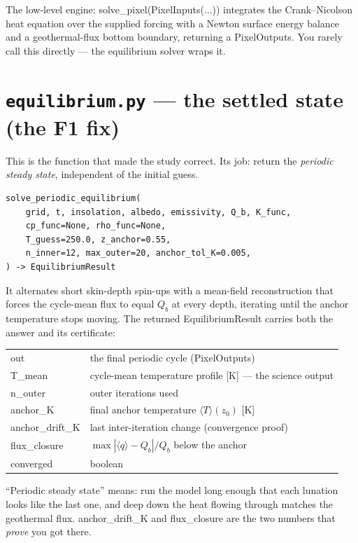 \documentclass[11pt]{report}
\newcommand{\code}[1]{{\ttfamily\small #1}}
\begin{document}
The low-level engine: \code{solve\_pixel(PixelInputs(...))} integrates the
Crank--Nicolson heat equation over the supplied forcing with a Newton
surface energy balance and a geothermal-flux bottom boundary, returning a
\code{PixelOutputs}. You rarely call this directly --- the equilibrium
solver wraps it.

\section{\texttt{equilibrium.py} --- the settled state (the F1 fix)}

This is the function that made the study correct. Its job: return the
\emph{periodic steady state}, independent of the initial guess.

\begin{lstlisting}[style=py]
solve_periodic_equilibrium(
    grid, t, insolation, albedo, emissivity, Q_b, K_func,
    cp_func=None, rho_func=None,
    T_guess=250.0, z_anchor=0.55,
    n_inner=12, max_outer=20, anchor_tol_K=0.005,
) -> EquilibriumResult
\end{lstlisting}

It alternates short skin-depth spin-ups with a mean-field reconstruction
that forces the cycle-mean flux to equal $Q_b$ at every depth, iterating
until the anchor temperature stops moving. The returned
\code{EquilibriumResult} carries both the answer and its certificate:

\begin{center}\small
\begin{tabular}{@{}lp{9.6cm}@{}}
\toprule
\code{out} & the final periodic cycle (\code{PixelOutputs}) \\
\code{T\_mean} & cycle-mean temperature profile [K] --- the science output \\
\code{n\_outer} & outer iterations used \\
\code{anchor\_K} & final anchor temperature $\langle T\rangle(z_0)$ [K] \\
\code{anchor\_drift\_K} & last inter-iteration change (convergence proof) \\
\code{flux\_closure} & $\max|\langle q\rangle-Q_b|/Q_b$ below the anchor \\
\code{converged} & boolean \\
\bottomrule
\end{tabular}
\end{center}

\begin{plain}
``Periodic steady state'' means: run the model long enough that each
lunation looks like the last one, and deep down the heat flowing through
matches the geothermal flux. \code{anchor\_drift\_K} and
\code{flux\_closure} are the two numbers that \emph{prove} you got there.
\end{plain}
\end{document}
